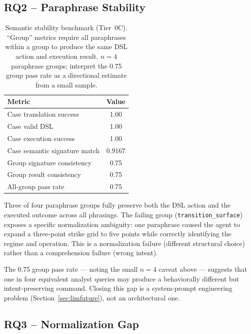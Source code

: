 \documentclass[11pt,a4paper]{article}
\begin{document}
\subsection{RQ2 -- Paraphrase Stability}

\begin{table}[ht]
\centering
\caption{Semantic stability benchmark (Tier~0C). ``Group'' metrics require all
paraphrases within a group to produce the same DSL action and execution result.
$n=4$ paraphrase groups; interpret the 0.75 group pass rate as a directional estimate
from a small sample.}
\begin{tabular}{@{}lc@{}}
\toprule
Metric & Value \\ \midrule
Case translation success & 1.00 \\
Case valid DSL & 1.00 \\
Case execution success & 1.00 \\
Case semantic signature match & 0.9167 \\
Group signature consistency & 0.75 \\
Group result consistency & 0.75 \\
All-group pass rate & 0.75 \\ \bottomrule
\end{tabular}
\label{tab:stability}
\end{table}

Three of four paraphrase groups fully preserve both the DSL action and the executed
outcome across all phrasings. The failing group (\texttt{transition\_surface}) exposes a
specific normalization ambiguity: one paraphrase caused the agent to expand a
three-point strike grid to five points while correctly identifying the regime and
operation. This is a normalization failure (different structural choice) rather than a
comprehension failure (wrong intent).

The 0.75 group pass rate --- noting the small $n=4$ caveat above --- suggests that one in
four equivalent analyst queries may produce a behaviorally different but intent-preserving
command. Closing this gap is a system-prompt engineering problem (Section~\ref{sec:limfuture}), not an architectural one.

\subsection{RQ3 -- Normalization Gap}
\end{document}
